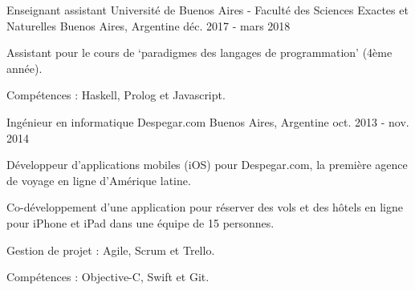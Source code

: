 \begin{cventries}
\cventry
{Enseignant assistant} %
{Université de Buenos Aires - Faculté des Sciences Exactes et Naturelles} %
{Buenos Aires, Argentine} %
{déc. 2017 - mars 2018} %
{
  \begin{cvitems} %
    \item Assistant pour le cours de `paradigmes des langages de programmation' (4ème année). 
    \item Compétences : Haskell, Prolog et Javascript.
  \end{cvitems}
}


\cventry
{Ingénieur en informatique}
{Despegar.com}
{Buenos Aires, Argentine}
{oct. 2013 - nov. 2014}
{
\begin{cvitems}
\item Développeur d'applications mobiles (iOS) pour Despegar.com, la première agence de voyage en ligne d'Amérique latine.
\item Co-développement d'une application pour réserver des vols et des hôtels en ligne pour iPhone et iPad dans une équipe de 15 personnes. 
\item Gestion de projet : Agile, Scrum et Trello.
\item Compétences : Objective-C, Swift et Git.
\end{cvitems}
} 
\end{cventries}
